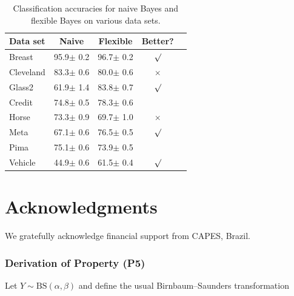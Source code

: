 \documentclass[12pt]{article}%
\numberwithin{equation}{section} %
\begin{document}
\begin{table}[H]
\caption{Classification accuracies for naive Bayes and flexible
Bayes on various data sets.}
\label{sample-table}
\vskip 0.15in
\begin{center}
\begin{small}
\begin{sc}
\begin{tabular}{lcccr}
\toprule
Data set & Naive & Flexible & Better? \\
\midrule
Breast    & 95.9$\pm$ 0.2& 96.7$\pm$ 0.2& $\surd$ \\
Cleveland & 83.3$\pm$ 0.6& 80.0$\pm$ 0.6& $\times$\\
Glass2    & 61.9$\pm$ 1.4& 83.8$\pm$ 0.7& $\surd$ \\
Credit    & 74.8$\pm$ 0.5& 78.3$\pm$ 0.6&         \\
Horse     & 73.3$\pm$ 0.9& 69.7$\pm$ 1.0& $\times$\\
Meta      & 67.1$\pm$ 0.6& 76.5$\pm$ 0.5& $\surd$ \\
Pima      & 75.1$\pm$ 0.6& 73.9$\pm$ 0.5&         \\
Vehicle   & 44.9$\pm$ 0.6& 61.5$\pm$ 0.4& $\surd$ \\
\bottomrule
\end{tabular}
\end{sc}
\end{small}
\end{center}
\vskip -0.1in
\end{table}
%



\section*{Acknowledgments}

We gratefully acknowledge financial support from CAPES, Brazil.



 


\appendix


\subsubsection*{Derivation of Property (P5)}

Let $Y\sim \mathrm{BS}(\alpha,\beta)$ and define the usual Birnbaum--Saunders transformation
\end{document}
